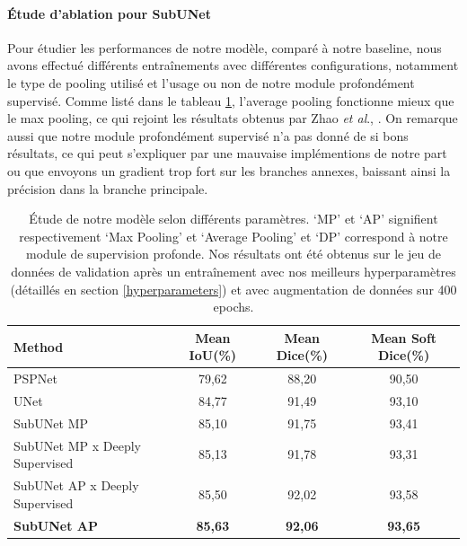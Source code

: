 \documentclass[french, english]{article}
\newcommand{\etal}{\textit{et al}., }
\begin{document}
\paragraph{Étude d'ablation pour SubUNet} Pour étudier les performances de notre modèle, comparé à notre baseline, nous avons effectué différents entraînements avec différentes configurations, notamment le type de pooling utilisé et l'usage ou non de notre module profondément supervisé. Comme listé dans le tableau \ref{tab:ablation:model}, l'average pooling fonctionne mieux que le max pooling, ce qui rejoint les résultats obtenus par Zhao \etal\cite{PSPNet}. On remarque aussi que notre module profondément supervisé n'a pas donné de si bons résultats, ce qui peut s'expliquer par une mauvaise implémentions de notre part ou que envoyons un gradient trop fort sur les branches annexes, baissant ainsi la précision dans la branche principale.
\begin{table}[H]
    \footnotesize
    \centering
    \begin{tabular}{ l c c c }
        \hline
        Method & Mean IoU(\%) & Mean Dice(\%) & Mean Soft Dice(\%) \\
        \hline\hline
        PSPNet & 79,62 & 88,20 & 90,50 \\
        UNet & 84,77 & 91,49 & 93,10 \\
        SubUNet MP & 85,10 & 91,75 & 93,41 \\
        SubUNet MP x Deeply Supervised & 85,13 & 91,78 & 93,31 \\
        SubUNet AP x Deeply Supervised & 85,50 & 92,02 & 93,58 \\
        \textbf{SubUNet AP} & \textbf{85,63} & \textbf{92,06} & \textbf{93,65} \\
        \hline
    \end{tabular}
    \caption{Étude de notre modèle selon différents paramètres. `MP' et `AP' signifient respectivement   `Max Pooling' et `Average Pooling' et `DP' correspond à notre module de supervision profonde. Nos résultats ont été obtenus sur le jeu de données de validation après un entraînement avec nos meilleurs hyperparamètres (détaillés en section \ref{hyperparameters}) et avec augmentation de données sur 400 epochs.}
    \label{tab:ablation:model}
\end{table}
\end{document}
